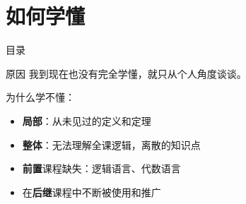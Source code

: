 \documentclass[pdf]{beamer}
\numberwithin{equation}{section}
\theoremstyle{plain}
\theoremstyle{plain}
\theoremstyle{plain}
\theoremstyle{remark}
\begin{document}
\section{如何学懂}
\begin{frame}{目录}
\tableofcontents[currentsection]
\end{frame}
\begin{frame}{原因}
	我到现在也没有完全学懂，就只从个人角度谈谈。
	
	为什么学不懂：
	\begin{itemize}
		\item \textbf{局部}：从未见过的定义和定理
		\item \textbf{整体}：无法理解全课逻辑，离散的知识点
		\item \textbf{前置}课程缺失：逻辑语言、代数语言
		\item 在\textbf{后继}课程中不断被使用和推广
	\end{itemize}
\end{frame}
\end{document}
